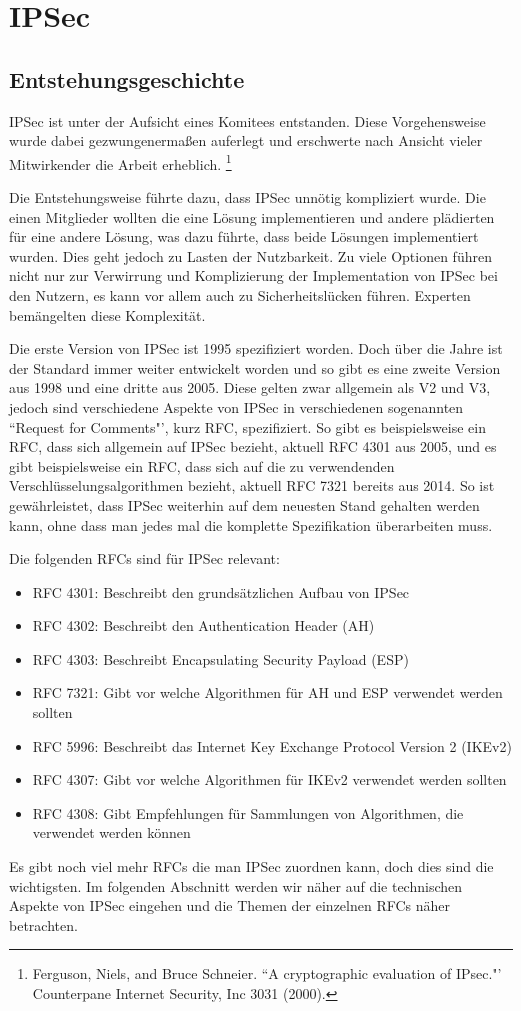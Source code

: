 \documentclass[12pt]{scrartcl}
\begin{document}
\section{IPSec}
\subsection{Entstehungsgeschichte}
IPSec ist unter der Aufsicht eines Komitees entstanden. Diese Vorgehensweise wurde dabei gezwungenermaßen auferlegt und erschwerte nach Ansicht vieler Mitwirkender die Arbeit erheblich. \footnote{Ferguson, Niels, and Bruce Schneier. ``A cryptographic evaluation of IPsec."' Counterpane Internet Security, Inc 3031 (2000).} 

Die Entstehungsweise führte dazu, dass IPSec unnötig kompliziert wurde. Die einen Mitglieder wollten die eine Lösung implementieren und andere plädierten für eine andere Lösung, was dazu führte, dass beide Lösungen implementiert wurden. Dies geht jedoch zu Lasten der Nutzbarkeit. Zu viele Optionen führen nicht nur zur Verwirrung und Komplizierung der Implementation von IPSec bei den Nutzern, es kann vor allem auch zu Sicherheitslücken führen. Experten bemängelten diese Komplexität.

Die erste Version von IPSec ist 1995 spezifiziert worden. Doch über die Jahre ist der Standard immer weiter entwickelt worden und so gibt es eine zweite Version aus 1998 und eine dritte aus 2005. Diese gelten zwar allgemein als V2 und V3, jedoch sind verschiedene Aspekte von IPSec in verschiedenen sogenannten ``Request for Comments"', kurz RFC, spezifiziert. So gibt es beispielsweise ein RFC, dass sich allgemein auf IPSec bezieht, aktuell RFC 4301 aus 2005, und es gibt beispielsweise ein RFC, dass sich auf die zu verwendenden Verschlüsselungsalgorithmen bezieht, aktuell RFC 7321 bereits aus 2014. So ist gewährleistet, dass IPSec weiterhin auf dem neuesten Stand gehalten werden kann, ohne dass man jedes mal die komplette Spezifikation überarbeiten muss.

Die folgenden RFCs sind für IPSec relevant:
\begin{itemize}
\item RFC 4301: Beschreibt den grundsätzlichen Aufbau von IPSec
\item RFC 4302: Beschreibt den Authentication Header (AH)
\item RFC 4303: Beschreibt Encapsulating Security Payload (ESP)
\item RFC 7321: Gibt vor welche Algorithmen für AH und ESP verwendet werden sollten
\item RFC 5996: Beschreibt das Internet Key Exchange Protocol Version 2 (IKEv2)
\item RFC 4307: Gibt vor welche Algorithmen für IKEv2 verwendet werden sollten
\item RFC 4308: Gibt Empfehlungen für Sammlungen von Algorithmen, die verwendet werden können
\end{itemize}
Es gibt noch viel mehr RFCs die man IPSec zuordnen kann, doch dies sind die wichtigsten. Im folgenden Abschnitt werden wir näher auf die technischen Aspekte von IPSec eingehen und die Themen der einzelnen RFCs näher betrachten.
\end{document}
